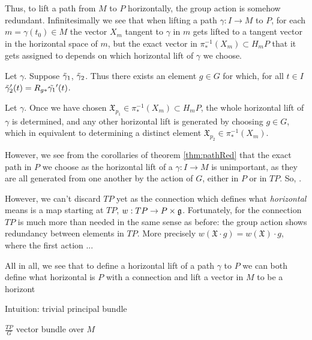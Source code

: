 Thus, to lift a path from $M$ to $P$ horizontally, the group action is somehow redundant. Infinitesimally we see that when lifting a path $\gamma:I \to M$ to $P$, for each $m = \gamma(t_0) \in M$ the vector $X_m$ tangent to $\gamma$ in $m$ gets lifted to a tangent vector in the horizontal space of $m$, but the exact vector in $\pi_*^{-1}(X_m) \subset H_mP$ that it gets assigned to depends on which horizontal lift of $\gamma$ we choose.

\begin{corollary}\label{cor:tpRed}
Let $\gamma$. Suppose $\Tilde{\gamma}_1$, $\Tilde{\gamma}_2$. Thus there exists an element $g \in G$ for which, for all $t \in I$ $\Tilde{\gamma}_2'(t) = R_{g*}\Tilde{\gamma_1}'(t)$.
\end{corollary}


\begin{corollary}
Let $\gamma$. Once we have chosen $\mathfrak{X}_{p_1} \in \pi_*^{-1}(X_m) \subset H_mP$, the whole horizontal lift of $\gamma$ is determined, and any other horizontal lift is generated by choosing $g \in G$, which in equivalent to determining a distinct element $\mathfrak{X}_{p_2} \in \pi_*^{-1}(X_m)$.
\end{corollary}

However, we see from the corollaries of theorem \ref{thm:pathRed} that the exact path in $P$ we choose as the horizontal lift of a $\gamma:I \to M$ is unimportant, as they are all generated from one another by the action of $G$, either in $P$ or in $TP$. So, .

However, we can't discard $TP$ yet as the connection which defines what \emph{horizontal} means is  a map starting at $TP$,  $w:TP \to P\times \mathfrak{g}$. Fortunately, for the connection $TP$ is much more than needed in the same sense as before: the group action shows redundancy between elements in $TP$. More precisely $w(\mathfrak{X}\cdot g) = w(\mathfrak{X}) \cdot g$, where the first action ...

All in all, we see that to define a horizontal lift of a path $\gamma$ to $P$ we can both define what horizontal is $P$ with a connection and lift a vector in $M$ to be a horizont

Intuition: trivial principal bundle

\begin{definition}
$\frac{TP}{G}$ vector bundle over $M$
\end{definition}

